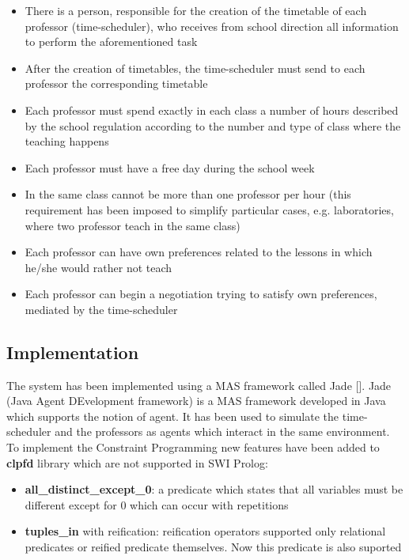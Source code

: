 \begin{itemize}
    \item There is a person, responsible for the creation of the timetable of each professor (time-scheduler), who receives from school direction all information to perform the aforementioned task
    \item After the creation of timetables, the time-scheduler must send to each professor the corresponding timetable
    \item Each professor must spend exactly in each class a number of hours described by the school regulation according to the number and type of class where the teaching happens
    \item Each professor must have a free day during the school week
    \item In the same class cannot be more than one professor per hour (this requirement has been imposed to simplify particular cases, e.g. laboratories, where two professor teach in the same class)
    \item Each professor can have own preferences related to the lessons in which he/she would rather not teach 
    \item Each professor can begin a negotiation trying to satisfy own preferences, mediated by the time-scheduler   
\end{itemize}

\subsection{Implementation}\label{subsec:implementation}
The system has been implemented using a MAS framework called Jade [\cite{10.1007/3-540-44631-1_7}].
Jade (Java Agent DEvelopment framework) is a MAS framework developed in Java which supports the notion of agent. It has been used to simulate the time-scheduler and the professors as agents which interact in the same environment.\newline
To implement the Constraint Programming new features have been added to \textbf{clpfd} library which are not supported in SWI Prolog:
\begin{itemize}
    \item \textbf{all\_distinct\_except\_0}: a predicate which states that all variables must be different except for 0 which can occur with repetitions
    \item \textbf{tuples\_in} with reification: reification operators supported only relational predicates or reified predicate themselves. Now this predicate is also suported
\end{itemize}

